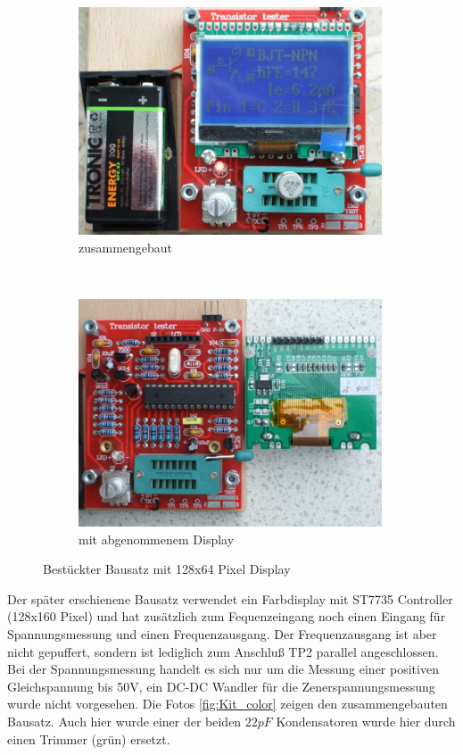 \begin{figure}[H]
  \begin{subfigure}[b]{9cm}
    \centering
    \includegraphics[width=9cm]{../PNG/Kit_ST7565a.jpg}
    \caption{zusammengebaut}
  \end{subfigure}
  ~
  \begin{subfigure}[b]{9cm}
    \centering
    \includegraphics[width=9cm]{../PNG/Kit_ST7565b.jpg}
    \caption{mit abgenommenem Display}
  \end{subfigure}
  \caption{Bestückter Bausatz mit 128x64 Pixel Display}
  \label{fig:Kit_mono}
\end{figure}

Der später erschienene Bausatz verwendet ein Farbdisplay mit ST7735 Controller (128x160 Pixel) 
und hat zusätzlich zum Fequenzeingang noch einen Eingang für Spannungsmessung und einen Frequenzausgang.
Der Frequenzausgang ist aber nicht gepuffert, sondern ist lediglich zum Anschluß TP2 parallel 
angeschlossen. Bei der Spannungsmessung handelt es sich nur um die Messung einer positiven Gleichspannung bis 50V,
ein DC-DC Wandler für die Zenerspannungsmessung wurde nicht vorgesehen.
Die Fotos \ref{fig:Kit_color} zeigen den zusammengebauten Bausatz.
Auch hier wurde einer der beiden \(22 pF\) Kondensatoren 
wurde hier durch einen Trimmer (grün) ersetzt. 

